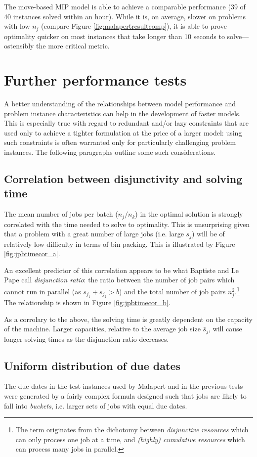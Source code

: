 \documentclass[13pt, letterpaper, oneside]{book}
\begin{document}
The move-based MIP model is able to achieve a comparable performance (39 of 40
instances solved within an hour). While it is, on average, slower on problems
with low $n_j$ (compare Figure \ref{fig:malapertresultcomp}), it is able to
prove optimality quicker on most instances that take longer than 10 seconds to
solve---ostensibly the more critical metric.

\section{Further performance tests}
A better understanding of the relationships between model performance and
problem instance characteristics can help in the development of faster models.
This is especially true with regard to redundant and/or lazy constraints that
are used only to achieve a tighter formulation at the price of a larger model:
using such constraints is often warranted only for particularly challenging
problem instances. The following paragraphs outline some such considerations.

\subsection{Correlation between disjunctivity and solving time}
\label{sec:disjunctivity}
The mean number of jobs per batch ($n_j/n_k$) in the optimal solution is
strongly correlated with the time needed to solve to
optimality. This is unsurprising given that a problem with a great number of large
jobs (i.e. large $s_j$) will be of relatively low
difficulty in terms of bin packing. This is illustrated by Figure
\ref{fig:jpbtimecor_a}.

An excellent predictor of this correlation appears to be what Baptiste and Le Pape
\citet{baptistelepape} call \textit{disjunction ratio}: the ratio between the
number of job pairs which cannot run in parallel (as $s_{j_1} + s_{j_2} > b$) and
the total number of job pairs $n_j^2$.\footnote{The term originates from the
dichotomy between \textit{disjunctive resources} which can only process one job
at a time, and \textit{(highly) cumulative resources} which can process many
jobs in parallel.} The relationship is shown in Figure
\ref{fig:jpbtimecor_b}.

As a corrolary to the above, the solving time is greatly dependent on the
capacity of the machine. Larger capacities, relative to the average job size
$\bar{s}_j$, will cause longer solving times as the disjunction ratio decreases.

\subsection{Uniform distribution of due dates}
The due dates in the test instances used by Malapert and in the previous tests
were generated by a fairly complex formula designed such that jobs are likely to
fall into \textit{buckets}, i.e. larger sets of jobs with equal due dates.
\end{document}
